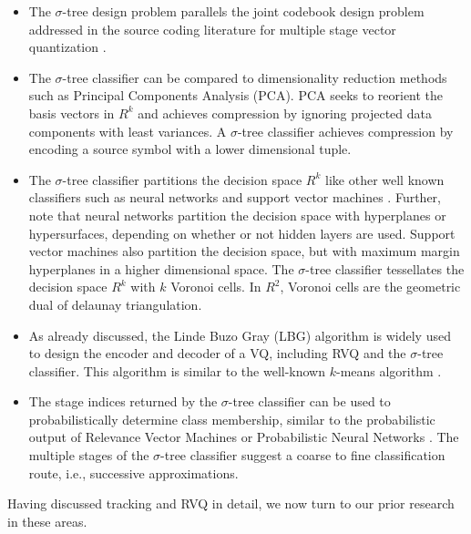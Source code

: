 \documentclass[12pt,letterpaper,doublespaced,ETD,proposal]{gt-ece-thesis}
\begin{document}
\begin{Body}
\begin{itemize}
\item The $\sigma$-tree design problem parallels the joint codebook design problem addressed in the source coding literature for multiple stage vector quantization \cite{1996_JNL_AdvancesRVQ_Barnes}.  

\item The $\sigma$-tree classifier can be compared to dimensionality reduction methods such as Principal Components Analysis (PCA).  PCA seeks to reorient the basis vectors in $R^k$ and achieves compression by ignoring projected data components with least variances.  A $\sigma$-tree classifier achieves compression by encoding a source symbol with a lower dimensional tuple.

\item The $\sigma$-tree classifier partitions the decision space $R^k$ like other well known classifiers such as neural networks and support vector machines \cite{2007_JNL_IDDM_Barnes}.  Further, note that neural networks partition the decision space with hyperplanes or hypersurfaces, depending on whether or not hidden layers are used.  Support vector machines also partition the decision space, but with maximum margin hyperplanes in a higher dimensional space.  The $\sigma$-tree classifier tessellates the decision space $R^k$ with $k$ Voronoi cells.  In $R^2$, Voronoi cells are the geometric dual of delaunay triangulation.  

\item As already discussed, the Linde Buzo Gray (LBG) algorithm is widely used to design the encoder and decoder of a VQ, including RVQ and the $\sigma$-tree classifier.  This algorithm is similar to the well-known $k$-means algorithm \cite{1967_CNF_Kmeans_Macqueen}.

\item The stage indices returned by the $\sigma$-tree classifier can be used to probabilistically determine class membership, similar to the probabilistic output of Relevance Vector Machines \cite{2001_JNL_RVM_Tipping} or Probabilistic Neural Networks \cite{1990_JNL_PNN_Specht}.  The multiple stages of the $\sigma$-tree classifier suggest a coarse to fine classification route, i.e., successive approximations.
\end{itemize}

Having discussed tracking and RVQ in detail, we now turn to our prior research in these areas.




\end{Body}
\end{document}
